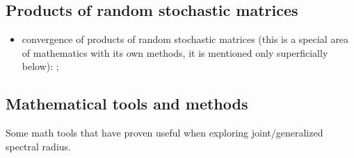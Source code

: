 \documentclass[a4paper,fleqn]{article}
\let\cite=\citep
\begin{document}
\subsection*{Products of random stochastic matrices}
\begin{itemize}
\item convergence of products of random stochastic matrices (this is a special area of mathematics with its own methods, it is mentioned only superficially below): \cite{AT:JMAA77, BXMS:IEEETSP13, Cohn:IJMMS, CMS:LAA21, CMMS:EJP23, DHH:ArXiv14, DHX:AUT11, OgurMart:LAA13, Leiz:LAA92, LimaRah:JPA94, Prot:MS11, Thomas:ArXiv11, Thomas:ArXiv13, Wolf:PAMS};
\end{itemize}

\subsection*{Mathematical tools and methods}
Some math tools that have proven useful when exploring joint/generalized spectral radius.
\end{document}
